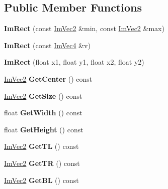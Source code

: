\subsection*{Public Member Functions}
\begin{DoxyCompactItemize}
\item 
\mbox{\label{structImRect_a2f0ff273434bfd9d22bb699fd7a63a1f}} 
{\bfseries Im\+Rect} (const \hyperlink{structImVec2}{Im\+Vec2} \&min, const \hyperlink{structImVec2}{Im\+Vec2} \&max)
\item 
\mbox{\label{structImRect_adfe8d43381f9af8a3e3ea32a3821ab84}} 
{\bfseries Im\+Rect} (const \hyperlink{structImVec4}{Im\+Vec4} \&v)
\item 
\mbox{\label{structImRect_a4cd168f1ae088e15db64b95b880f8933}} 
{\bfseries Im\+Rect} (float x1, float y1, float x2, float y2)
\item 
\mbox{\label{structImRect_aae13f8003184fd84f29d27c3c074cf43}} 
\hyperlink{structImVec2}{Im\+Vec2} {\bfseries Get\+Center} () const
\item 
\mbox{\label{structImRect_ae459d9c50003058cfb34519a571aaf33}} 
\hyperlink{structImVec2}{Im\+Vec2} {\bfseries Get\+Size} () const
\item 
\mbox{\label{structImRect_afa75cb8491f20901c96166d17dcddac4}} 
float {\bfseries Get\+Width} () const
\item 
\mbox{\label{structImRect_a748d8ae9cb26508951ec6e2f2df0625b}} 
float {\bfseries Get\+Height} () const
\item 
\mbox{\label{structImRect_a1d4d972329722b51dca4499cb5931b4b}} 
\hyperlink{structImVec2}{Im\+Vec2} {\bfseries Get\+TL} () const
\item 
\mbox{\label{structImRect_acae90248a96be4acf1524071fca1c3f3}} 
\hyperlink{structImVec2}{Im\+Vec2} {\bfseries Get\+TR} () const
\item 
\mbox{\label{structImRect_a59d9751bc7be6745dddf5b83b9155669}} 
\hyperlink{structImVec2}{Im\+Vec2} {\bfseries Get\+BL} () const

\end{DoxyCompactItemize}
